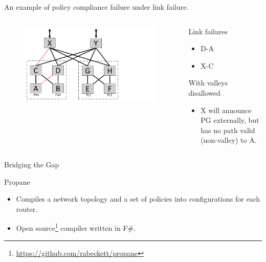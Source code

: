 \begin{frame}{An example of policy compliance failure under link failure.}
    \begin{columns}
        \begin{column}{0.45\textwidth}
            \begin{figure}
                \includegraphics[width=1\textwidth,keepaspectratio,clip,trim={0cm 0cm 9cm 0cm}]{figures/ex2_2_failed_links.pdf}
            \end{figure}
        \end{column}
        \begin{column}{0.50\textwidth}
            \begin{block}{Link failures}
                \begin{itemize}
                    \item D-A
                    \item X-C
                \end{itemize}
            \end{block}
            \begin{block}{With valleys disallowed}
                \begin{itemize}
                    \item X will announce PG externally, but has no path valid (non-valley) to A.
                \end{itemize}
            \end{block}
        \end{column}
    \end{columns}
\end{frame}


\begin{frame}{Bridging the Gap}
    \begin{block}{Propane}
        \begin{itemize}
            \item Compiles a network topology and a set of policies into configurations for each router.
            \item Open source\footnote{\url{https://github.com/rabeckett/propane}} compiler written in F\#.
        \end{itemize}
    \end{block}
\end{frame}

